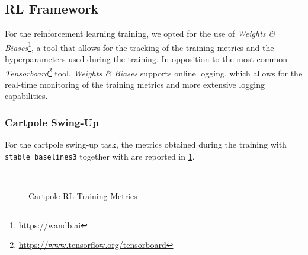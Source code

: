 \subsection{RL Framework}

For the reinforcement learning training, we opted for the use of \textit{Weights {\&} Biases}\footnote{\url{https://wandb.ai}}, a tool that allows for the tracking of the training metrics and the hyperparameters used during the training. In opposition to the most common \textit{Tensorboard}\footnote{\url{https://www.tensorflow.org/tensorboard}} tool, \textit{Weights {\&} Biases} supports online logging, which allows for the real-time monitoring of the training metrics and more extensive logging capabilities.


\subsubsection{Cartpole Swing-Up}

For the cartpole swing-up task, the metrics obtained during the training with \texttt{stable\_baselines3} together with \jaxsim are reported in \cref{fig:cartpoleresults}.

\begin{figure}
    \centering
    \caption{Cartpole RL Training Metrics}
    \label{fig:cartpoleresults}
     \\
\end{figure}


